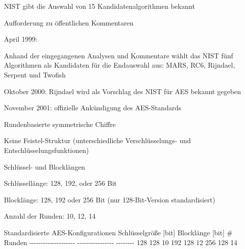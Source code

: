 \documentclass[a4paper]{article}
\begin{document}
\begin{multicols}{3}
\begin{itemize*}
            \begin{itemize*}
                  \item NIST gibt die Auswahl von 15 Kandidatenalgorithmen bekannt
                  \item Aufforderung zu öffentlichen Kommentaren
            \end{itemize*}
            \item
            April 1999:

            \begin{itemize*}
                  \item Anhand der eingegangenen Analysen und Kommentare wählt das NIST fünf Algorithmen als Kandidaten für die Endauswahl aus: MARS, RC6, Rijndael, Serpent und Twofish
            \end{itemize*}
            \item
            Oktober 2000: Rijndael wird als Vorschlag des NIST für AES bekannt
            gegeben

            \begin{itemize*}
                  \item \begin{enumerate*} \def\labelenumi{\arabic{enumi}.} \setcounter{enumi}{25} \item November 2001: offizielle Ankündigung des AES-Standards \end{enumerate*}
            \end{itemize*}
            \item
            Rundenbasierte symmetrische Chiffre
            \item
            Keine Feistel-Struktur (unterschiedliche Verschlüsselungs- und
            Entschlüsselungsfunktionen)
            \item
            Schlüssel- und Blocklängen

            \begin{itemize*}
                  \item Schlüssellänge: 128, 192, oder 256 Bit
                  \item Blocklänge: 128, 192 oder 256 Bit (nur 128-Bit-Version standardisiert)
                  \item Anzahl der Runden: 10, 12, 14
            \end{itemize*}
      \end{itemize*}

      Standardisierte AES-Konfigurationen \textbar{} Schlüsselgröße {[}bit{]}
      \textbar{} Blocklänge {[}bit{]} \textbar{} \# Runden \textbar{}
      \textbar{} -\/-\/-\/-\/-\/-\/-\/-\/-\/-\/-\/-\/-\/-\/-\/-\/-\/-\/-\/-
      \textbar{} -\/-\/-\/-\/-\/-\/-\/-\/-\/-\/-\/-\/-\/-\/-\/- \textbar{}
      -\/-\/-\/-\/-\/-\/-\/- \textbar{} \textbar{} 128 \textbar{} 128
      \textbar{} 10 \textbar{} \textbar{} 192 \textbar{} 128 \textbar{} 12
      \textbar{} \textbar{} 256 \textbar{} 128 \textbar{} 14 \textbar{}


\end{multicols}
\end{document}
